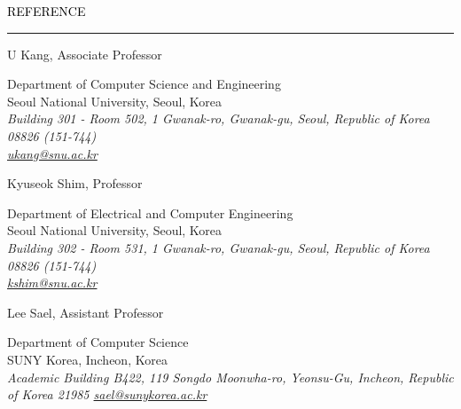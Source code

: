 \documentclass{resume} %
\renewenvironment{rSection}[1]{
	\sectionskip
	\textcolor{Black}{\MakeUppercase{#1}}
	\sectionlineskip
	\hrule
	\begin{list}{}{
			\setlength{\leftmargin}{1.5em}
		}
		\item[]
	}{
	\end{list}
}
\begin{document}
	\begin{rSection}{Reference}
	\begin{rSubsection}{U Kang, Associate Professor}{}{}{}
		\item Department of Computer Science and Engineering\\
		Seoul National University, Seoul, Korea\\
		\em Building 301 - Room 502, 1 Gwanak-ro, Gwanak-gu, Seoul, Republic of Korea 08826 (151-744) \em \\
		\href{mailto:ukang@snu.ac.kr}{\textit{ukang@snu.ac.kr}}
	\end{rSubsection}
	\vspace{-2mm}		
	\begin{rSubsection}{Kyuseok Shim, Professor}{}{}{}
		\item Department of Electrical and Computer Engineering\\
		Seoul National University, Seoul, Korea\\
		\em Building 302 - Room 531, 1 Gwanak-ro, Gwanak-gu, Seoul, Republic of Korea 08826 (151-744) \em \\
		\href{mailto:kshim@snu.ac.kr}{\textit{kshim@snu.ac.kr}}
	\end{rSubsection}
	\vspace{-2mm}		
	\begin{rSubsection}{Lee Sael, Assistant Professor}{}{}{}
		\item Department of Computer Science\\
		SUNY Korea, Incheon, Korea\\
		\em Academic Building B422, 119 Songdo Moonwha-ro, Yeonsu-Gu, Incheon, Republic of Korea 21985
		\href{mailto:sael@sunykorea.ac.kr}{\textit{sael@sunykorea.ac.kr}}
	\end{rSubsection}
				
	\end{rSection}
		
	
\end{document}
